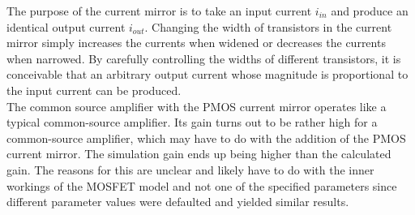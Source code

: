 The purpose of the current mirror is to take an input current $i_{in}$ and produce an identical output current $i_{out}$. Changing the width of transistors in the current mirror simply increases the currents when widened or decreases the currents when narrowed. By carefully controlling the widths of different transistors, it is conceivable that an arbitrary output current whose magnitude is proportional to the input current can be produced. \\

The common source amplifier with the PMOS current mirror operates like a typical common-source amplifier. Its gain turns out to be rather high for a common-source amplifier, which may have to do with the addition of the PMOS current mirror. The simulation gain ends up being higher than the calculated gain. The reasons for this are unclear and likely have to do with the inner workings of the MOSFET model and not one of the specified parameters since different parameter values were defaulted and yielded similar results.
